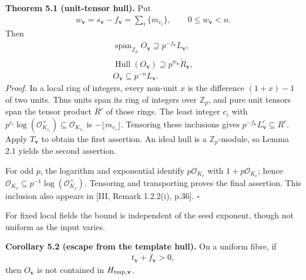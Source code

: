 \documentclass[11pt,a4paper]{amsart}
\begin{document}
\par\smallskip\noindent\textbf{Theorem 5.1 (unit-tensor hull).} Put
\begin{equation}
\begin{gathered}
w_{\mathbf v}=s_{\mathbf v}-f_{\mathbf v}=\sum_i\{m_{v_i}\},\qquad 0\le w_{\mathbf v}<n.
\end{gathered}
\tag{5.2}\label{eq:5.2}
\end{equation}
Then
\begin{equation}
\begin{gathered}
\operatorname{span}_{\mathbb Z_p}O_{\mathbf v}\supseteq p^{-f_{\mathbf v}}L_{\mathbf v},\\
\operatorname{Hull}(O_{\mathbf v})\supseteq p^{w_{\mathbf v}}\widetilde R_{\mathbf v},\\
O_{\mathbf v}\subseteq p^{-n}L_{\mathbf v}.
\end{gathered}
\tag{5.3}\label{eq:5.3}
\end{equation}
\emph{Proof.} In a local ring of integers, every non-unit $x$ is the difference $(1+x)-1$ of two units. Thus units span its ring of integers over $\mathbb Z_p$, and pure unit tensors span the tensor product $R^c$ of those rings. The least integer $c_i$ with $p^{c_i}\log(\mathcal O_{K_{v_i}}^\times)\subseteq\mathcal O_{K_{v_i}}$ is $-\lfloor m_{v_i}\rfloor$. Tensoring these inclusions gives $p^{-f_{\mathbf v}}L^c_{\mathbf v}\subseteq R^c$. Apply $T_{\mathbf v}$ to obtain the first assertion. An ideal hull is a $\mathbb Z_p$-module, so Lemma 2.1 yields the second assertion.


For odd $p$, the logarithm and exponential identify $p\mathcal O_{K_v}$ with $1+p\mathcal O_{K_v}$; hence $\mathcal O_{K_v}\subseteq p^{-1}\log(\mathcal O_{K_v}^\times)$. Tensoring and transporting proves the final assertion. This inclusion also appears in [III, Remark 1.2.2(i), p.36]. \hfill$\square$


For fixed local fields the bound is independent of the seed exponent, though not uniform as the input varies.


\par\smallskip\noindent\textbf{Corollary 5.2 (escape from the template hull).} On a uniform fibre, if
\begin{equation}
\begin{gathered}
t_{\mathbf v}+f_{\mathbf v}>0,
\end{gathered}
\tag{5.4}\label{eq:5.4}
\end{equation}
then $O_{\mathbf v}$ is not contained in $H_{{\rm tmp},\mathbf v}$.
\end{document}
